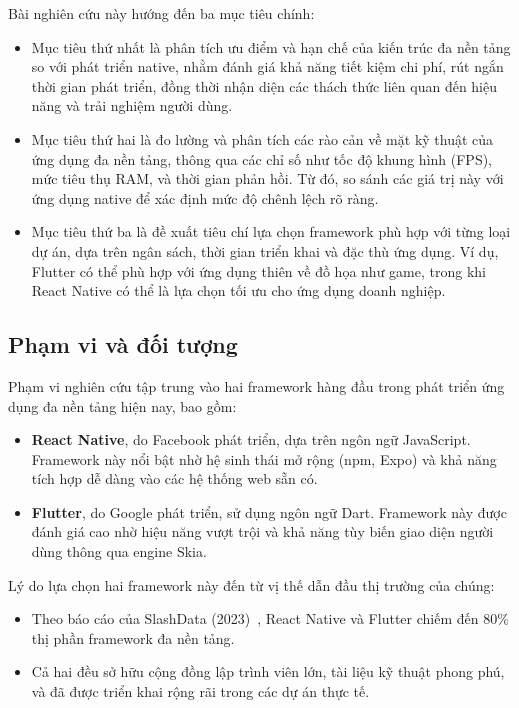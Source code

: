     \hspace*{0.8cm}Bài nghiên cứu này hướng đến ba mục tiêu chính:
    \setlength{\leftmargini}{1.0cm}
    \begin{itemize}
        \item Mục tiêu thứ nhất là phân tích ưu điểm và hạn chế của kiến trúc đa nền tảng so với phát triển native, nhằm đánh giá khả năng tiết kiệm chi phí, rút ngắn thời gian phát triển, đồng thời nhận diện các thách thức liên quan đến hiệu năng và trải nghiệm người dùng.
        \item Mục tiêu thứ hai là đo lường và phân tích các rào cản về mặt kỹ thuật của ứng dụng đa nền tảng, thông qua các chỉ số như tốc độ khung hình (FPS), mức tiêu thụ RAM, và thời gian phản hồi. Từ đó, so sánh các giá trị này với ứng dụng native để xác định mức độ chênh lệch rõ ràng.
        \item Mục tiêu thứ ba là đề xuất tiêu chí lựa chọn framework phù hợp với từng loại dự án, dựa trên ngân sách, thời gian triển khai và đặc thù ứng dụng. Ví dụ, Flutter có thể phù hợp với ứng dụng thiên về đồ họa như game, trong khi React Native có thể là lựa chọn tối ưu cho ứng dụng doanh nghiệp.
    \end{itemize}
\vspace{0.5em}

\subsection{Phạm vi và đối tượng}
\renewcommand{\labelitemi}{--}    

    \hspace*{0.8cm}Phạm vi nghiên cứu tập trung vào hai framework hàng đầu trong phát triển ứng dụng đa nền tảng hiện nay, bao gồm:
    \setlength{\leftmargini}{1.0cm}
    \begin{itemize}
        \item \textbf{React Native}, do Facebook phát triển, dựa trên ngôn ngữ JavaScript. Framework này nổi bật nhờ hệ sinh thái mở rộng (npm, Expo) và khả năng tích hợp dễ dàng vào các hệ thống web sẵn có.
        \item \textbf{Flutter}, do Google phát triển, sử dụng ngôn ngữ Dart. Framework này được đánh giá cao nhờ hiệu năng vượt trội và khả năng tùy biến giao diện người dùng thông qua engine Skia.
    \end{itemize}
\vspace{0.5em}


    \hspace*{0.8cm}Lý do lựa chọn hai framework này đến từ vị thế dẫn đầu thị trường của chúng:
    \setlength{\leftmargini}{1.0cm}
    \begin{itemize}
        \item Theo báo cáo của SlashData (2023)~\cite{slashdata2023}, React Native và Flutter chiếm đến 80\% thị phần framework đa nền tảng.
        \item Cả hai đều sở hữu cộng đồng lập trình viên lớn, tài liệu kỹ thuật phong phú, và đã được triển khai rộng rãi trong các dự án thực tế.
    \end{itemize}
\vspace{0.5em}


